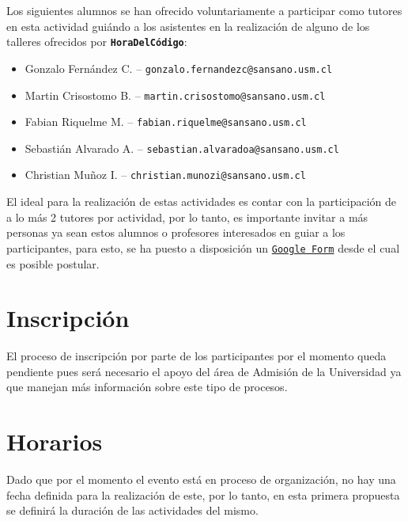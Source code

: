 \documentclass[letterpaper,12pt]{article}
\begin{document}
Los siguientes alumnos se han ofrecido voluntariamente a participar como tutores en esta actividad guiándo a los asistentes en la realización de alguno de los talleres ofrecidos por \texttt{\textbf{HoraDelCódigo}}:

\begin{itemize}
    \item Gonzalo Fernández C. -- \texttt{gonzalo.fernandezc@sansano.usm.cl} 
    \item Martin Crisostomo B. -- \texttt{martin.crisostomo@sansano.usm.cl} 
    \item Fabian Riquelme M. -- \texttt{fabian.riquelme@sansano.usm.cl}
    \item Sebastián Alvarado A. -- \texttt{sebastian.alvaradoa@sansano.usm.cl}
    \item Christian Muñoz I. -- \texttt{christian.munozi@sansano.usm.cl}
\end{itemize}

El ideal para la realización de estas actividades es contar con la participación de a lo más 2 tutores por actividad, por lo tanto, es importante invitar a más personas ya sean estos alumnos o profesores interesados en guiar a los participantes, para esto, se ha puesto a disposición un \texttt{\href{https://goo.gl/forms/qtJc6NDwXBY16QoZ2}{Google Form}} desde el cual es posible postular.

\section{Inscripción}

El proceso de inscripción por parte de los participantes por el momento queda pendiente pues será necesario el apoyo del área de Admisión de la Universidad ya que manejan más información sobre este tipo de procesos.

\section{Horarios}

Dado que por el momento el evento está en proceso de organización, no hay una fecha definida para la realización de este, por lo tanto, en esta primera propuesta se definirá la duración de las actividades del mismo.
\end{document}
